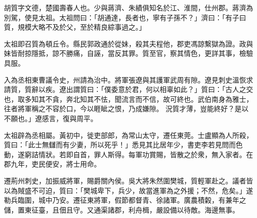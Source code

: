 \begin{pinyinscope}
 
 
 胡質字文德，楚國壽春人也。少與蔣濟、朱績俱知名於江、淮間，仕州郡。蔣濟為別駕，使見太祖。太祖問曰：「胡通達，長者也，寧有子孫不？」濟曰：「有子曰質，規模大略不及於父，至於精良綜事過之。」
 
 
 太祖即召質為頓丘令。縣民郭政通於從妹，殺其夫程他，郡吏馮諒繫獄為證。政與妹皆耐掠隱抵，諒不勝痛，自誣，當反其罪。質至官，察其情色，更詳其事，檢驗具服。
 
 
入為丞相東曹議令史，州請為治中。將軍張遼與其護軍武周有隙。遼見刺史溫恢求請質，質辭以疾。遼出謂質曰：「僕委意於君，何以相辜如此？」質曰：「古人之交也，取多知其不貪，奔北知其不怯，聞流言而不信，故可終也。武伯南身為雅士，往者將軍稱之不容於口，今以睚眦之恨，乃成嫌隙。
 況質才薄，豈能終好？是以不願也。」遼感言，復與周平。
 
 
 
 
 太祖辟為丞相屬。黃初中，徙吏部郎，為常山太守，遷任東莞。士盧顯為人所殺，質曰：「此士無讎而有少妻，所以死乎！」悉見其比居年少，書吏李若見問而色動，遂窮詰情狀。若即自首，罪人斯得。每軍功賞賜，皆散之於衆，無入家者。在郡九年，吏民便安，將士用命。
 
 
 
 
 遷荊州刺史，加振威將軍，賜爵關內侯。吳大將朱然圍樊城，質輕軍赴之。議者皆以為賊盛不可迫，質曰：「樊城卑下，兵少，故當進軍為之外援；不然，危矣。」遂勒兵臨圍，城中乃安。遷征東將軍，假節都督青、徐諸軍。廣農積糓，有兼年之儲，置東征臺，且佃且守。又通渠諸郡，利舟楫，嚴設備以待敵。海邊無事。
 

\end{pinyinscope}
